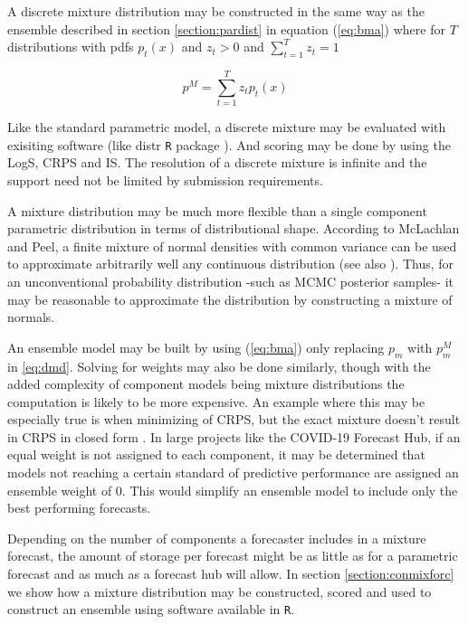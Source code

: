 \documentclass[11pt,notitlepage]{isuthesis}
\begin{document}
A discrete mixture distribution may be constructed in the same way as the
ensemble described in section \ref{section:pardist} in equation 
(\ref{eq:bma}) 
where for $T$ distributions
with pdfs $p_t(x)$ and $z_t > 0$ and $\sum_{t=1}^{T} z_t = 1$
 

\begin{equation}
\label{eq:dmd}
  p^{M} = \sum_{t=1}^T z_tp_t(x)
\end{equation}




Like the standard parametric model, a discrete mixture may be evaluated with
exisiting software (like distr \texttt{R} package \cite{camphausen2007distr}). 
And 
scoring may be done by 
using the LogS, CRPS and IS. The resolution of a discrete mixture is infinite 
and the support need not be limited by submission requirements. 

A mixture distribution may be much more flexible than a single component 
parametric distribution in 
terms of distributional shape. According to 
McLachlan and Peel, a finite mixture of 
normal densities with common variance can be used to approximate arbitrarily 
well
any continuous distribution \cite{peel2000finite} (see also 
\cite{nguyen2019approximations}). Thus, for an unconventional probability
distribution -such as MCMC posterior samples- it may be reasonable to 
approximate the distribution by constructing a mixture of normals.

An ensemble model may be built by using (\ref{eq:bma}) only replacing $p_m$
with $p_m^M$ in \ref{eq:dmd}. Solving for weights may also be done similarly, 
though with the 
added complexity of component models being mixture distributions the 
computation is likely to be more expensive. An example where this may be
especially true is when minimizing of CRPS, but the exact mixture doesn't 
result in CRPS in closed form \cite{baran2018combining}. In large projects like
the COVID-19 Forecast Hub, if an equal weight is not assigned to each component,
it may be determined that models not reaching a certain standard of predictive
performance are
assigned an ensemble weight of 0. This would simplify an ensemble model to 
include only the best performing forecasts.

Depending on the number of components a forecaster includes in a mixture 
forecast, the amount of storage per forecast might be as little as for a 
parametric forecast and as much as a forecast hub will allow. In section
\ref{section:conmixforc} we show how a mixture distribution may be constructed,
scored and used to construct an ensemble using software available in 
\texttt{R}.
\end{document}
